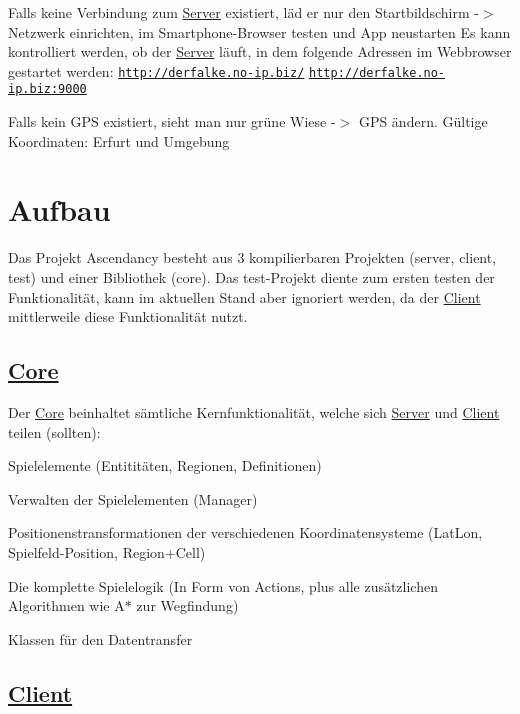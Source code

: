 \begin{DoxyItemize}
\item Falls keine Verbindung zum \hyperlink{namespaceServer}{Server} existiert, läd er nur den Startbildschirm -\/$>$ Netzwerk einrichten, im Smartphone-\/\-Browser testen und App neustarten Es kann kontrolliert werden, ob der \hyperlink{namespaceServer}{Server} läuft, in dem folgende Adressen im Webbrowser gestartet werden\-: \href{http://derfalke.no-ip.biz/}{\tt http\-://derfalke.\-no-\/ip.\-biz/} \href{http://derfalke.no-ip.biz:9000}{\tt http\-://derfalke.\-no-\/ip.\-biz\-:9000}
\item Falls kein G\-P\-S existiert, sieht man nur grüne Wiese -\/$>$ G\-P\-S ändern. Gültige Koordinaten\-: Erfurt und Umgebung
\end{DoxyItemize}

\section*{Aufbau}

Das Projekt Ascendancy besteht aus 3 kompilierbaren Projekten (server, client, test) und einer Bibliothek (core). Das test-\/\-Projekt diente zum ersten testen der Funktionalität, kann im aktuellen Stand aber ignoriert werden, da der \hyperlink{namespaceClient}{Client} mittlerweile diese Funktionalität nutzt.

\subsection*{\hyperlink{namespaceCore}{Core}}

Der \hyperlink{namespaceCore}{Core} beinhaltet sämtliche Kernfunktionalität, welche sich \hyperlink{namespaceServer}{Server} und \hyperlink{namespaceClient}{Client} teilen (sollten)\-:
\begin{DoxyItemize}
\item Spielelemente (Entititäten, Regionen, Definitionen)
\item Verwalten der Spielelementen (Manager)
\item Positionenstransformationen der verschiedenen Koordinatensysteme (Lat\-Lon, Spielfeld-\/\-Position, Region+\-Cell)
\item Die komplette Spielelogik (In Form von Actions, plus alle zusätzlichen Algorithmen wie A$\ast$ zur Wegfindung)
\item Klassen für den Datentransfer
\end{DoxyItemize}

\subsection*{\hyperlink{namespaceClient}{Client}}


